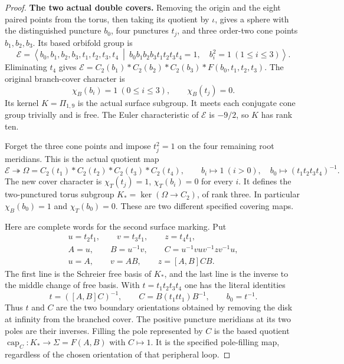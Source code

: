 \begin{proof}
\par\medskip\noindent\textbf{The two actual double covers.}\quad
Removing the origin and the eight paired points from the torus,
then taking its quotient by $\iota$, gives a sphere with the
distinguished puncture $b_0$, four punctures $t_j$, and three
order-two cone points $b_1,b_2,b_3$.  Its based orbifold group is
\[
 \mathcal E=
 \left\langle b_0,b_1,b_2,b_3,t_1,t_2,t_3,t_4\ \middle|\
 b_0b_1b_2b_3t_1t_2t_3t_4=1,\quad b_i^2=1\ (1\leq i\leq3)
 \right\rangle.
                                                               \tag{FBO.7}
\]
Eliminating $t_4$ gives
$\mathcal E=C_2(b_1)*C_2(b_2)*C_2(b_3)*
F(b_0,t_1,t_2,t_3)$.
The original branch-cover character is
\[
 \chi_B(b_i)=1\ (0\leq i\leq3),\qquad
 \chi_B(t_j)=0.
                                                               \tag{FBO.8}
\]
Its kernel $K=\Pi_{1,9}$ is the actual surface subgroup.
It meets each conjugate cone group trivially and is free.
The Euler characteristic of $\mathcal E$ is $-9/2$,
so $K$ has rank ten.

Forget the three cone points and impose $t_j^2=1$ on the four
remaining root meridians.  This is the actual quotient map
\[
 \mathcal E\twoheadrightarrow
 \Omega=C_2(t_1)*C_2(t_2)*C_2(t_3)*C_2(t_4),\qquad
 b_i\longmapsto1\ (i>0),\quad
 b_0\longmapsto(t_1t_2t_3t_4)^{-1}.
                                                               \tag{FBO.9}
\]
The new cover character is
$\chi_T(t_j)=1$, $\chi_T(b_i)=0$ for every $i$.
It defines the two-punctured torus subgroup
$K_*=\ker(\Omega\to C_2)$, of rank three.
In particular $\chi_B(b_0)=1$ and $\chi_T(b_0)=0$.
These are two different specified covering maps.

Here are complete words for the second surface marking.  Put
\[
 \begin{gathered}
 u=t_2t_1,\qquad v=t_3t_1,\qquad z=t_4t_1,\\
 A=u,\qquad B=u^{-1}v,\qquad
 C=u^{-1}vuv^{-1}zv^{-1}u,\\
 u=A,\qquad v=AB,\qquad z=[A,B]CB.
 \end{gathered}                                                   \tag{FBO.10}
\]
The first line is the Schreier free basis of $K_*$, and the last
line is the inverse to the middle change of free basis.  With
$t=t_1t_2t_3t_4$ one has the literal identities
\[
       t=([A,B]C)^{-1},\qquad
       C=B(t_1tt_1)B^{-1},\qquad b_0=t^{-1}.
                                                               \tag{FBO.11}
\]
Thus $t$ and $C$ are the two boundary orientations obtained by
removing the disk at infinity from the branched cover.  The
positive puncture meridians at its two poles are their inverses.
Filling the pole represented by $C$ is the based quotient
$\operatorname{cap}_C:K_*\to\Sigma=F(A,B)$ with $C\mapsto1$.
It is the specified pole-filling map, regardless of the chosen
orientation of that peripheral loop.


\end{proof}
